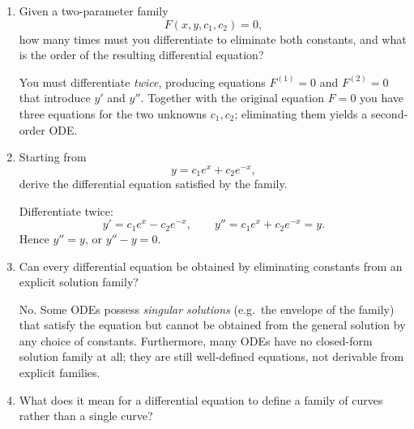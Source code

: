 \documentclass{self-check}
\begin{document}
\begin{enumerate}[leftmargin=*, itemsep=8pt]
    \begin{answer} The IFT hypothesis fails; we can no longer
      guarantee a local smooth branch $y=f(x)$ near such a point.
      Geometrically, these are \emph{singular points}: the tangent line
      may be vertical (if $F_x\neq 0$), or the curve may cross itself,
      develop a cusp, or be isolated.  The implicit-derivative formula
      $-F_x/F_y$ is undefined there.
    \end{answer}

  \item Given a two-parameter family \[ F(x,y,c_1,c_2)=0, \] how many
    times must you differentiate to eliminate both constants, and
    what is the order of the resulting differential equation?

    \begin{answer} You must differentiate \emph{twice}, producing
      equations $F^{(1)}=0$ and $F^{(2)}=0$ that introduce $y'$ and
      $y''$.  Together with the original equation $F=0$ you have three
      equations for the two unknowns $c_1,c_2$; eliminating them yields
      a second-order ODE.
    \end{answer}

  \item Starting from \[ y=c_1e^x+c_2e^{-x}, \] derive the
    differential equation satisfied by the family.

    \begin{answer} Differentiate twice:
      \[
        y'  = c_1 e^x - c_2 e^{-x}, \qquad
        y'' = c_1 e^x + c_2 e^{-x} = y.
      \]
      Hence $y'' = y$, or $y''-y=0$.
    \end{answer}

  \item Can every differential equation be obtained by eliminating
    constants from an explicit solution family?

    \begin{answer} No.  Some ODEs possess \emph{singular solutions}
      (e.g.\ the envelope of the family) that satisfy the equation but
      cannot be obtained from the general solution by any choice of
      constants.  Furthermore, many ODEs have no closed-form solution
      family at all; they are still well-defined equations, not
      derivable from explicit families.
    \end{answer}

  \item What does it mean for a differential equation to define a
    family of curves rather than a single curve?


\end{enumerate}
\end{document}
